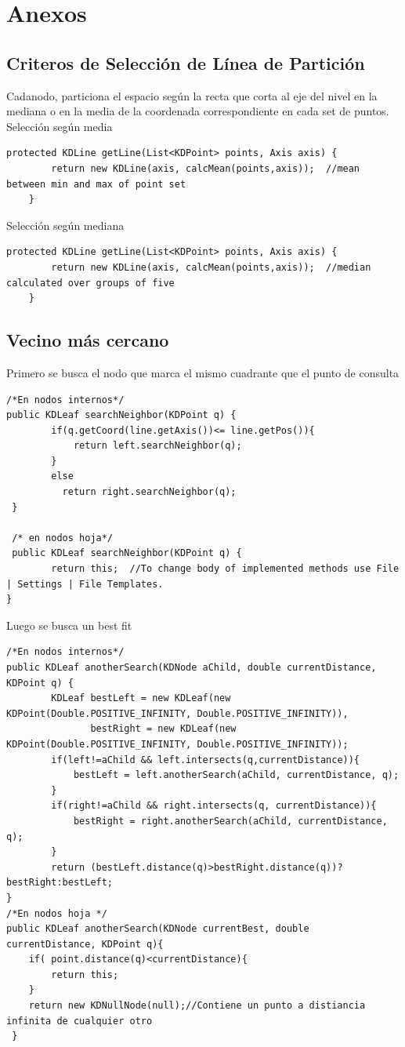 \documentclass[12pt,letterpaper, margin = 3cm]{article}
\begin{document}
\newpage
\section{Anexos}
\subsection{Criteros de Selección de Línea de Partición}
Cadanodo, particiona el espacio según la recta que corta al eje del nivel en la mediana o en la media de la coordenada correspondiente en cada set de puntos. \\
Selección según media
\begin{lstlisting}
protected KDLine getLine(List<KDPoint> points, Axis axis) {
        return new KDLine(axis, calcMean(points,axis));  //mean between min and max of point set
    }
\end{lstlisting}
Selección según mediana
\begin{lstlisting}
protected KDLine getLine(List<KDPoint> points, Axis axis) {
        return new KDLine(axis, calcMean(points,axis));  //median calculated over groups of five
    }
\end{lstlisting}
\subsection{Vecino más cercano}
Primero se busca el nodo que marca el mismo cuadrante que el punto de consulta
\begin{lstlisting}
/*En nodos internos*/
public KDLeaf searchNeighbor(KDPoint q) {
        if(q.getCoord(line.getAxis())<= line.getPos()){
            return left.searchNeighbor(q);
        }
        else
          return right.searchNeighbor(q);
 }
 
 /* en nodos hoja*/
 public KDLeaf searchNeighbor(KDPoint q) {
        return this;  //To change body of implemented methods use File | Settings | File Templates.
}
\end{lstlisting}
Luego se busca un best fit
\begin{lstlisting}
/*En nodos internos*/
public KDLeaf anotherSearch(KDNode aChild, double currentDistance, KDPoint q) {
        KDLeaf bestLeft = new KDLeaf(new KDPoint(Double.POSITIVE_INFINITY, Double.POSITIVE_INFINITY)),
               bestRight = new KDLeaf(new KDPoint(Double.POSITIVE_INFINITY, Double.POSITIVE_INFINITY));
        if(left!=aChild && left.intersects(q,currentDistance)){
            bestLeft = left.anotherSearch(aChild, currentDistance, q);
        }
        if(right!=aChild && right.intersects(q, currentDistance)){
            bestRight = right.anotherSearch(aChild, currentDistance, q);
        }
        return (bestLeft.distance(q)>bestRight.distance(q))? bestRight:bestLeft;
}
/*En nodos hoja */
public KDLeaf anotherSearch(KDNode currentBest, double currentDistance, KDPoint q){
    if( point.distance(q)<currentDistance){
        return this;
    }
    return new KDNullNode(null);//Contiene un punto a distiancia infinita de cualquier otro
 }
\end{lstlisting}



\end{document}
